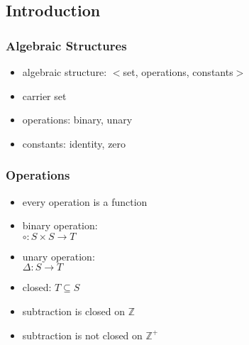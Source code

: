 \documentclass[dvipsnames]{beamer}
\begin{document}
\subsection{Introduction}

\begin{frame}
  \frametitle{Algebraic Structures}

  \begin{itemize}
    \item \alert{algebraic structure}: $<$set, operations, constants$>$

    \bigskip
    \item carrier set
    \item operations: binary, unary
    \item constants: identity, zero
  \end{itemize}
\end{frame}

\begin{frame}
  \frametitle{Operations}

  \begin{itemize}
    \item every operation is a function

    \medskip
    \item binary operation:\\
      $\circ: S \times S \rightarrow T$
    \item unary operation:\\
      $\Delta: S \rightarrow T$

    \pause
    \medskip
    \item \alert{closed}: $T \subseteq S$
  \end{itemize}
  \begin{example}
    \begin{itemize}
      \item subtraction is closed on $\mathbb{Z}$
      \item subtraction is not closed on $\mathbb{Z^+}$
    \end{itemize}
  \end{example}
\end{frame}
\end{document}
